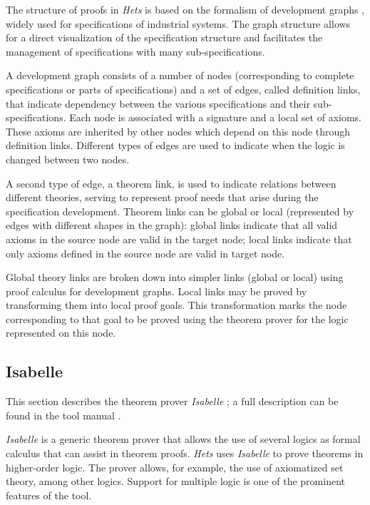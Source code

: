 \documentclass[12pt,twoside]{article}
\numberwithin{spec}{subsection}
\numberwithin{proof}{subsection}
\numberwithin{figure}{subsection}
\numberwithin{code}{subsection}
\begin{document}
The structure of proofs in \textit{Hets} is based on the formalism of development graphs \citep{Mossakowski2006}, widely used for specifications of industrial systems. The graph structure allows for a direct visualization of the specification structure and facilitates the management of specifications with many sub-specifications.

A development graph consists of a number of nodes (corresponding to complete specifications or parts of specifications) and a set of edges, called definition links, that indicate dependency between the various specifications and their sub-specifications. Each node is associated with a signature and a local set of axioms. These axioms are inherited by other nodes which depend on this node through definition links. Different types of edges are used to indicate when the logic is changed between two nodes.

A second type of edge, a theorem link, is used to indicate relations between different theories, serving to represent proof needs that arise during the specification development. Theorem links can be global or local (represented by edges with different shapes in the graph): global links indicate that all valid axioms in the source node are valid in the target node; local links indicate that only axioms defined in the source node are valid in target node.

Global theory links are broken down into simpler links (global or local) using proof calculus for development graphs. Local links may be proved by transforming them into local proof goals. This transformation marks the node corresponding to that goal to be proved using the theorem prover for the logic represented on this node.

\subsection{Isabelle}
This section describes the  theorem prover \textit{Isabelle} \citep{IsabelleSite}; a full description can be found in the tool manual \citep{Nipkow-Paulson-Wenzel:2002}.

\textit{Isabelle} is a generic theorem prover that allows the use of several logics as formal calculus that can assist in theorem proofs. \textit{Hets} uses \textit{Isabelle} to prove theorems in higher-order logic. The prover allows, for example, the use of axiomatized set theory, among other logics. Support for multiple logic is one of the prominent features of the tool.
\end{document}
